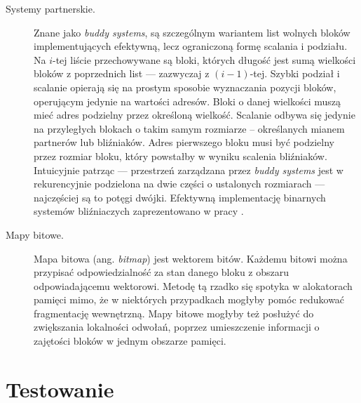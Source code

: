 \documentclass[12pt,a4paper,titlepage,twoside]{mwart}
\begin{document}
\begin{description}

\item[Systemy partnerskie.] Znane jako \textit{buddy systems}, są szczególnym
wariantem list wolnych bloków implementujących efektywną, lecz ograniczoną
formę scalania i podziału. Na $i$-tej liście przechowywane są bloki, których
długość jest sumą wielkości bloków z poprzednich list --- zazwyczaj z
$(i-1)$-tej. Szybki podział i scalanie opierają się na prostym sposobie
wyznaczania pozycji bloków, operującym jedynie na wartości adresów.  Bloki o
danej wielkości muszą mieć adres podzielny przez określoną wielkość.  Scalanie
odbywa się jedynie na przyległych blokach o takim samym rozmiarze --
określanych mianem partnerów lub bliźniaków. Adres pierwszego bloku musi być
podzielny przez rozmiar bloku, który powstałby w wyniku scalenia bliźniaków.
Intuicyjnie patrząc --- przestrzeń zarządzana przez \textit{buddy systems} jest w
rekurencyjnie podzielona na dwie części o ustalonych rozmiarach --- najczęściej
są to potęgi dwójki. Efektywną implementację binarnych systemów bliźniaczych
zaprezentowano w pracy \cite{demaine99fast}.

\vspace{1ex}

\item[Mapy bitowe.] Mapa bitowa (ang. \textit{bitmap}) jest wektorem bitów.
Każdemu bitowi można przypisać odpowiedzialność za stan danego bloku z obszaru
odpowiadającemu wektorowi. Metodę tą rzadko się spotyka w alokatorach pamięci
mimo, że w niektórych przypadkach mogłyby pomóc redukować fragmentację
wewnętrzną. Mapy bitowe mogłyby też posłużyć do zwiększania lokalności
odwołań, poprzez umieszczenie informacji o zajętości bloków w jednym
obszarze pamięci.

\end{description}

\newpage


\section{Testowanie}
\hypertarget{Testowanie}{}
\end{document}
